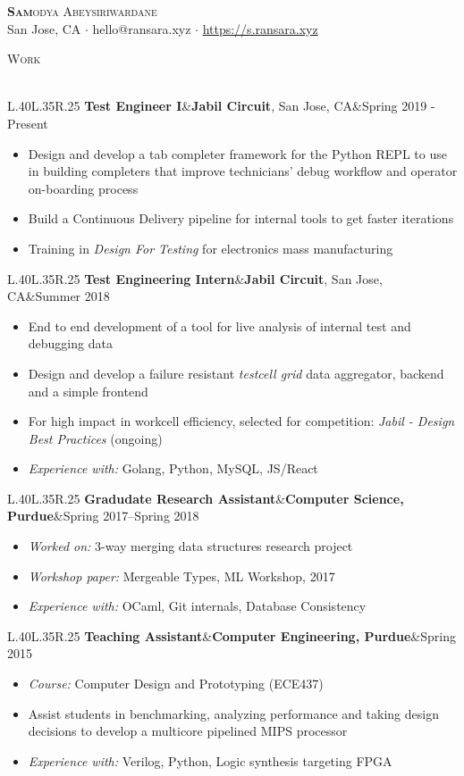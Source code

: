 \documentclass[a4paper]{article}
\newcommand{\header} [1] {
    {\hspace*{-18pt}\vspace*{6pt} \textsc{#1}
    \vspace*{-14pt} \\ \hspace*{-18pt} \hrulefill{} \\
    \vspace{1mm}}
}
\newcommand{\threeparts} [3] {
    {\setlength\tabcolsep{0pt}
    \begin{tabularx}{\linewidth}{L{.40\linewidth}L{.35\linewidth}R{.25\linewidth}} 
    \textbf{#1}&#2&#3
    \end{tabularx}}
}
\begin{document}
\begin{center}
	{\Huge \scshape {\textbf{Sam}odya Abeysiriwardane}}\\
	San Jose, CA $\cdot$ hello@ransara.xyz $\cdot$ \url{https://s.ransara.xyz}\\
\end{center}

\header{Work}
\threeparts{Test Engineer I}{\textbf{Jabil Circuit}, San Jose, CA}{Spring 2019 - Present}
\begin{itemize}[label=$\square$]
	\item Design and develop a tab completer framework for the Python REPL to use in building completers that improve technicians' debug workflow and operator on-boarding process
    \item Build a Continuous Delivery pipeline for internal tools to get faster iterations
    \item Training in \textit{Design For Testing} for electronics mass manufacturing
\end{itemize}
\threeparts{Test Engineering Intern}{\textbf{Jabil Circuit}, San Jose, CA}{Summer 2018}
\begin{itemize}[label=$\square$]
	\item End to end development of a tool for live analysis of internal test and debugging data
    \item Design and develop a failure resistant \textit{testcell grid} data aggregator, backend and a simple frontend
    \item For high impact in workcell efficiency, selected for competition: \textit{Jabil - Design Best Practices} (ongoing) 
    \item \textit{Experience with:} Golang, Python, MySQL, JS/React
\end{itemize}
\threeparts{Gradudate Research Assistant}{\textbf{Computer Science, Purdue}}{Spring 2017--Spring 2018}
\begin{itemize}[label=$\square$]
    \item \textit{Worked on:} 3-way merging data structures research project
    \item \textit{Workshop paper:} Mergeable Types, ML Workshop, 2017
	\item \textit{Experience with:} OCaml, Git internals, Database Consistency
\end{itemize}
\threeparts{Teaching Assistant}{\textbf{Computer Engineering, Purdue}}{Spring 2015}
\begin{itemize}[label=$\square$]
	\item \textit{Course:} Computer Design and Prototyping (ECE437)
    \item Assist students in benchmarking, analyzing performance and taking design decisions to develop a multicore pipelined MIPS processor
    \item \textit{Experience with:} Verilog, Python, Logic synthesis targeting FPGA
\end{itemize}
\end{document}
